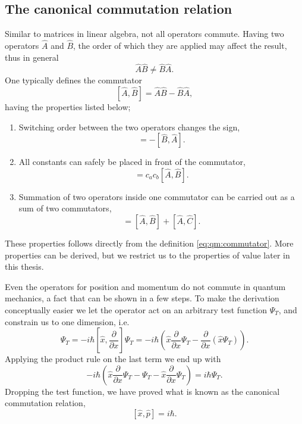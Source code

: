 \subsection{The canonical commutation relation}
\label{sec:qm:commutator}
Similar to matrices in linear algebra, not all operators commute.
Having two operators $\hat{A}$ and $\hat{B}$, the order of which they are applied may affect the result, thus in general
\begin{equation}
\hat{A}\hat{B} \neq \hat{B}\hat{A} .
\end{equation}
One typically defines the commutator
\begin{equation}
\label{eq:qm:commutator}
[\hat{A}, \hat{B}] = \hat{A}\hat{B} - \hat{B}\hat{A} ,
\end{equation}
having the properties listed below;
\begin{enumerate}[{\bf a. }]
\item Switching order between the two operators changes the sign,
\begin{equation}
[\hat{A}, \hat{B}] = - [\hat{B}, \hat{A}] .
\end{equation}
\item All constants can safely be placed in front of the commutator, 
\begin{equation}
[c_a \hat{A}, c_b\hat{B}] = c_a c_b [\hat{A}, \hat{B}] .
\end{equation}
\item Summation of two operators inside one commutator can be carried out as a sum of two commutators,
\begin{equation}
[\hat{A}, \hat{B} + \hat{C}] = [\hat{A}, \hat{B}] + [\hat{A}, \hat{C}] .
\end{equation}
\end{enumerate}
These properties follows directly from the definition \eqref{eq:qm:commutator}. 
More properties can be derived, but we restrict us to the properties of value later in this thesis.

Even the operators for position and momentum do not commute in quantum mechanics, a fact that can be shown in a few steps.
To make the derivation conceptually easier we let the operator act on an arbitrary test function $\Psi_T$, and constrain us to one dimension, i.e.
\begin{equation}
[\hat{x}, \hat{p}] \Psi_T = -i\hbar [\hat{x}, \frac{\partial}{\partial x}] \Psi_T 
= -i \hbar \left( \hat{x} \frac{\partial}{\partial x} \Psi_T - \frac{\partial}{\partial x}\left(\hat{x} \Psi_T \right) \right) .
\end{equation}
Applying the product rule on the last term we end up with
\begin{equation}
-i \hbar \left( \hat{x} \frac{\partial}{\partial x} \Psi_T - \Psi_T 
- \hat{x} \frac{\partial}{\partial x} \Psi_T \right)
= i\hbar \Psi_T .
\end{equation}
Dropping the test function, we have proved what is known as the canonical commutation relation,
\begin{equation}
\label{eq:qm:canonicalcommutation}
[\hat{x}, \hat{p}] = i\hbar .
\end{equation}




